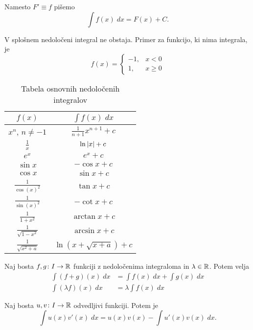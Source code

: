 \documentclass[12pt, a4paper]{article}
\begin{document}
Namesto $F'\equiv f$ pišemo
\[
\int f(x)\;dx=F(x)+C.
\]

\begin{opomba}
V splošnem nedoločeni integral ne obstaja. Primer za funkcijo, ki nima integrala, je
\[
f(x)=\begin{cases}
-1, & x < 0
\\
1,  & x \geq 0
\end{cases}
\]
\end{opomba}

\begin{table}[!h]
\centering
\begin{tabular}{c|c}
$f(x)$                   & $\displaystyle\int f(x)\;dx$ \\ \hline
$x^n$, $n\ne -1$         & $\frac{1}{n+1}x^{n+1}+c$     \\
$\frac{1}{x}$            & $\ln\left\lvert x\right\rvert+c$               \\
$e^x$                    & $e^x+c$                      \\
$\sin x$                 & $-\cos x+c$                  \\
$\cos x$                 & $\sin x + c$                 \\
$\frac{1}{\cos(x)^2}$    & $\tan x+c$                   \\
$\frac{1}{\sin(x)^2}$    & $-\cot x+c$                  \\
$\frac{1}{1+x^2}$        & $\arctan x+c$                \\
$\frac{1}{\sqrt{1-x^2}}$ & $\arcsin x+c$                \\
$\frac{1}{\sqrt{x^2+a}}$ & $\ln(x+\sqrt{x+a})+c$
\end{tabular}
\caption{Tabela osnovnih nedoločenih integralov}
\end{table}

\begin{trditev}
Naj bosta $f,g\colon I\to\mathbb{R}$ funkciji z nedoločenima integraloma in $\lambda\in\mathbb{R}$. Potem velja
\begin{align*}
\int(f+g)(x)\;dx &= \int f(x)\;dx+\int g(x)\;dx
\\
\int (\lambda f)(x)\;dx &= \lambda\int f(x)\;dx
\end{align*}
\end{trditev}

\obvs

\begin{trditev}
Naj bosta $u, v\colon I\to\mathbb{R}$ odvedljivi funkciji. Potem je
\[
\int u(x) v'(x)\;dx = u(x) v(x) - \int u'(x) v(x)\;dx.
\]
\end{trditev}
\end{document}
